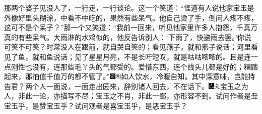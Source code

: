 那两个婆子见没人了，一行走，一行谈论。这一个笑道：“怪道有人说他家宝玉是外像好里头糊涂，中看不中吃的，果然有些呆气。他自己烫了手，倒问人疼不疼，这可不是个呆子？”那一个又笑道：“我前一回来，听见他家里许多人抱怨，千真万真的有些呆气。大雨淋的水鸡似的，他反告诉别人：‘下雨了，快避雨去罢。’你说可笑不可笑？时常没人在跟前，就自哭自笑的；看见燕子，就和燕子说话；河里看见了鱼，就和鱼说话；见了星星月亮，不是长吁短叹，就是咕咕哝哝的。且是连一点刚性也没有，连那些毛丫头的气都受的。爱惜东西，连个线头儿都是好的；糟踏起来，那怕值千值万的都不管了。”{\includegraphics[width=3mm]{../Images/00006}\includegraphics[width=3mm]{../Images/00011}\footnotesize \kaishu 如人饮水，冷暖自知。其中深意味，岂能持告君？}两个人一面说，一面走出园来，辞别诸人回去，不在话下。{\includegraphics[width=3mm]{../Images/00003}\includegraphics[width=3mm]{../Images/00012}\footnotesize \kaishu 宝玉之为人，非此一论，亦描写不尽；宝玉之不肖，非此一鄙，亦形容不到。试问作者是丑宝玉乎，是赞宝玉乎？试问观者是喜宝玉乎，是恶宝玉乎？}

